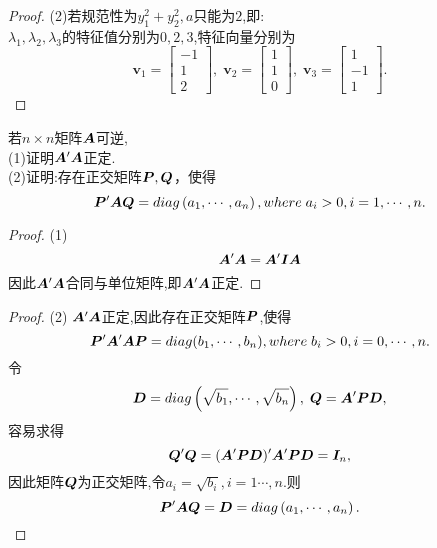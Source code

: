 \documentclass[lang=cn,11pt,normal]{elegantbook}
\begin{document}
	\begin{proof}
		(2)若规范性为$y_1^2+y_2^2,a$只能为$2$,即:\\
		$\lambda_1,\lambda_2,\lambda_3$的特征值分别为$0,2,3$,特征向量分别为
		\begin{equation}
		\boldsymbol{v}_1=\begin{bmatrix}-1\\1\\2\end{bmatrix},\;\boldsymbol{v}_2=\begin{bmatrix}1\\1\\0\end{bmatrix},\;\boldsymbol{v}_3=\begin{bmatrix}1\\-1\\1\end{bmatrix}.
		\end{equation}
	\end{proof}
	\begin{exercise}
		若$n\times n$矩阵$\AA$可逆,\\
		(1)证明$\AA'\AA$正定.\\
		(2)证明:存在正交矩阵$\PP,\QQ$，使得
		\begin{equation}
		\PP'\AA\QQ=diag\left(a_1,\cdots,a_n\right),where \; a_i>0,i=1,\cdots,n.
		\end{equation}
	\end{exercise}
	\begin{proof}
		(1)
		\begin{equation}
		\AA'\AA=\AA'\II\AA
		\end{equation}
		因此$\AA'\AA$合同与单位矩阵,即$\AA'\AA$正定.
	\end{proof}
	\begin{proof}
		(2)
		$\AA'\AA$正定,因此存在正交矩阵$\PP$,使得
		\begin{equation}
		\PP'\AA'\AA\PP=diag(b_1,\cdots,b_n),where\;b_i>0,i=0,\cdots,n.
		\end{equation}
		令
		\begin{equation}
		\DD=diag\left(\sqrt{b_1},\cdots,\sqrt{b_n}\right),\;\QQ=\AA'\PP\DD,
		\end{equation}
		容易求得
		\begin{equation}
		\QQ'\QQ=(\AA'\PP\DD)'\AA'\PP\DD=\II_n,
		\end{equation}
		因此矩阵$\QQ$为正交矩阵,令$a_i=\sqrt{b_i},i=1\cdots,n.$则
		\begin{equation}
		\PP'\AA\QQ=\DD=diag\left(a_1,\cdots,a_n\right).
		\end{equation}
	\end{proof}
\end{document}
